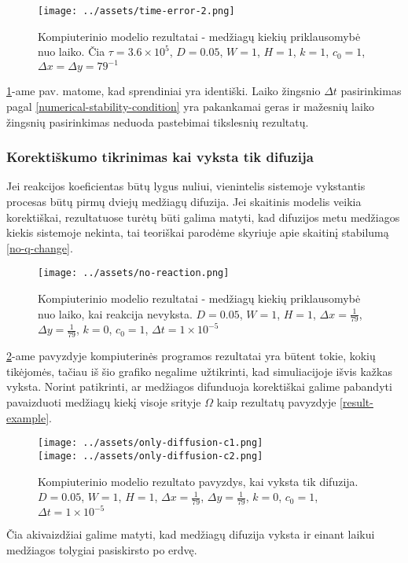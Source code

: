 \begin{figure}[h!]

\centering

\caption{Kompiuterinio modelio rezultatai - medžiagų kiekių priklausomybė nuo laiko. Čia $\tau=3.6\times 10^5$, $D=0.05$, $W = 1$, $H=1$, $k = 1$, $c_0 = 1$, $\Delta x = \Delta y = 79^{-1}$}

\texttt{[image: ../assets/time-error-2.png]}

\label{time-error}

\end{figure}

\ref{time-error}-ame pav. matome, kad sprendiniai yra identiški. Laiko žingsnio  $\Delta t$ pasirinkimas pagal \eqref{numerical-stability-condition} yra pakankamai geras ir mažesnių laiko žingsnių pasirinkimas neduoda pastebimai tikslesnių rezultatų.

\subsubsection*{Korektiškumo tikrinimas kai vyksta tik difuzija}

Jei reakcijos koeficientas būtų lygus nuliui, vienintelis sistemoje vykstantis procesas būtų pirmų dviejų medžiagų difuzija. Jei skaitinis modelis veikia korektiškai, rezultatuose turėtų būti galima matyti, kad difuzijos metu medžiagos kiekis sistemoje nekinta, tai teoriškai parodėme skyriuje apie skaitinį stabilumą \eqref{no-q-change}.

\newpage

\begin{figure}[h!]
    \centering
    \caption{Kompiuterinio modelio rezultatai - medžiagų kiekių priklausomybė nuo laiko, kai reakcija nevyksta. $D = 0.05$, $W = 1$, $H = 1$, $\Delta x = \frac{1}{79}$, $\Delta y = \frac{1}{79}$, $k = 0$, $c_0 = 1$, $\Delta t = 1\times 10^{-5}$ }
    \texttt{[image: ../assets/no-reaction.png]}
    \label{no-reaction}
\end{figure}

\ref{no-reaction}-ame pavyzdyje kompiuterinės programos rezultatai yra būtent tokie, kokių tikėjomės, tačiau iš šio grafiko negalime užtikrinti, kad simuliacijoje išvis kažkas vyksta. Norint patikrinti, ar medžiagos difunduoja korektiškai galime pabandyti pavaizduoti medžiagų kiekį visoje srityje $\Omega$ kaip rezultatų pavyzdyje \eqref{result-example}.

\begin{figure}[h!]
\centering
\caption{Kompiuterinio modelio rezultato pavyzdys, kai vyksta tik difuzija. $D = 0.05$, $W = 1$, $H = 1$, $\Delta x = \frac{1}{79}$, $\Delta y = \frac{1}{79}$, $k = 0$, $c_0 = 1$, $\Delta t = 1\times 10^{-5}$ }
\texttt{[image: ../assets/only-diffusion-c1.png]} \\
\texttt{[image: ../assets/only-diffusion-c2.png]}
\label{only-diffusion}
\end{figure}

Čia akivaizdžiai galime matyti, kad medžiagų difuzija vyksta ir einant laikui medžiagos tolygiai pasiskirsto po erdvę.


